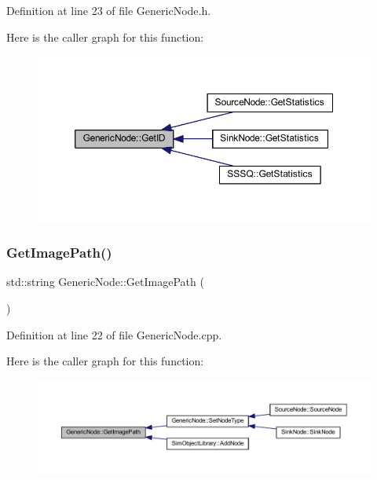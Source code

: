 Definition at line 23 of file Generic\+Node.\+h.

Here is the caller graph for this function\+:
\nopagebreak
\begin{figure}[H]
\begin{center}
\leavevmode
\includegraphics[width=350pt]{class_generic_node_aa73c27d677012efdcda65f7908c77758_icgraph}
\end{center}
\end{figure}
\mbox{\label{class_generic_node_a42d0bbdf6d82d68c48594b850fc8290f}} 
\subsubsection{\texorpdfstring{Get\+Image\+Path()}{GetImagePath()}}
{\footnotesize\ttfamily std\+::string Generic\+Node\+::\+Get\+Image\+Path (\begin{DoxyParamCaption}{ }\end{DoxyParamCaption})}



Definition at line 22 of file Generic\+Node.\+cpp.

Here is the caller graph for this function\+:
\nopagebreak
\begin{figure}[H]
\begin{center}
\leavevmode
\includegraphics[width=350pt]{class_generic_node_a42d0bbdf6d82d68c48594b850fc8290f_icgraph}
\end{center}
\end{figure}
\mbox{\label{class_generic_node_aaf9d163658172370e01ef5da113b66e0}} 

